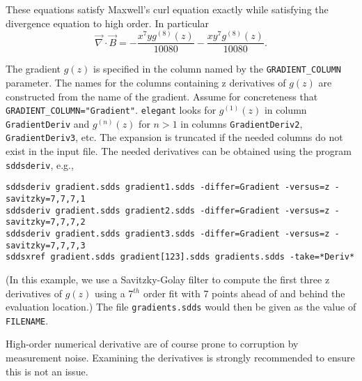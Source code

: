 These equations satisfy Maxwell's curl equation exactly while satisfying the divergence equation to high order.
In particular
\begin{equation}
\vec{\nabla} \cdot \vec{B} = -\frac{x^7 y g^{(8)}(z)}{10080}-\frac{x y^7 g^{(8)}(z)}{10080}.
\end{equation}

The gradient $g(z)$ is specified in the column named by the \verb|GRADIENT_COLUMN| parameter.
The names for the columns containing z derivatives of $g(z)$ are constructed from the name of the gradient.
Assume for concreteness that \verb|GRADIENT_COLUMN="Gradient"|. 
{\tt elegant} looks for $g^{(1)}(z)$ in column \verb|GradientDeriv| and 
$g^{(n)}(z)$ for $n>1$ in columns \verb|GradientDeriv2|, \verb|GradientDeriv3|,  etc.
The expansion is truncated if the needed columns do not exist in the input file.
The needed derivatives can be obtained using the program \verb|sddsderiv|, e.g.,
\begin{verbatim}
sddsderiv gradient.sdds gradient1.sdds -differ=Gradient -versus=z -savitzky=7,7,7,1
sddsderiv gradient.sdds gradient2.sdds -differ=Gradient -versus=z -savitzky=7,7,7,2
sddsderiv gradient.sdds gradient3.sdds -differ=Gradient -versus=z -savitzky=7,7,7,3
sddsxref gradient.sdds gradient[123].sdds gradients.sdds -take=*Deriv* 
\end{verbatim}
(In this example, we use a Savitzky-Golay filter to compute the first three z derivatives of $g(z)$
using a 7$^{th}$ order fit with 7 points ahead of and behind the evaluation location.)
The file \verb|gradients.sdds| would then be given as the value of \verb|FILENAME|.

High-order numerical derivative are of course prone to corruption by measurement noise. 
Examining the derivatives is strongly recommended to ensure this is not an issue.
